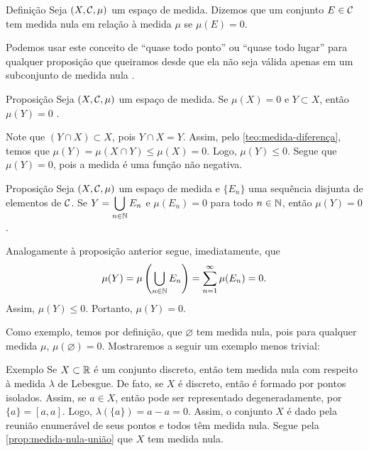 \begin{env}{Definição}
	\label{def:conjunto-medida-nula}
	Seja $(X, \operatorname{\mathcal{C}}, \mu)$ um espaço de medida.
	Dizemos que um conjunto $E \in \operatorname{\mathcal{C}}$ tem medida nula em relação à medida $\mu$ se $\mu(E) = 0$.
\end{env}

Podemos usar este conceito de \enquote{quase todo ponto} ou \enquote{quase todo lugar} para qualquer proposição que queiramos desde que ela não seja válida apenas em um subconjunto de medida nula \cite{bartle}.
\begin{env}{Proposição}
	\label{prop:medida-nula-subconjunto}
	Seja $(X, \operatorname{\mathcal{C}}, \mu)$ um espaço de medida.
	Se $\mu(X) = 0$ e $Y \subset X$, então $\mu(Y) = 0$ \cite[p.343, adaptação nossa]{elon}.
\end{env}
\begin{prova}
	Note que $(Y \cap X) \subset X$, pois $ Y \cap X = Y$.
	Assim, pelo \ref{teo:medida-diferença}, temos que
	$
	\mu(Y) = \mu(X \cap Y) \leq \mu(X) = 0
	$.
	Logo, $\mu(Y) \leq 0$.
	Segue que $\mu(Y) = 0$, pois a medida é uma função não negativa.
	\vspace{-0.4cm}
\end{prova}

\begin{env}{Proposição}
	\label{prop:medida-nula-união}
	Seja $(X, \operatorname{\mathcal{C}}, \mu)$ um espaço de medida e $\{E_n\}$ uma sequência disjunta de elementos de $\operatorname{\mathcal{C}}$.
	Se $Y = \displaystyle\bigcup_{n \in \operatorname{\mathbb{N}}}E_n$ e $\mu(E_n) = 0$ para todo $n \in \operatorname{\mathbb{N}}$, então $\mu(Y) = 0$ \cite[p.343, adaptação nossa]{elon}.
\end{env}
\begin{prova}
	Analogamente à proposição anterior segue, imediatamente, que
	$$
	\mu(Y)
	=
	\mu\left(\bigcup_{n \in \operatorname{\mathbb{N}}}E_n\right)
	=
	\sum_{n = 1}^\infty \mu(E_n)
	= 0.
	$$
	Assim,
	$\mu(Y)\leq 0$. Portanto, $\mu(Y) = 0$.
\end{prova}

Como exemplo, temos por definição, que $\varnothing$ tem medida nula, pois para qualquer medida $\mu$, $\mu(\varnothing) = 0$.
Mostraremos a seguir um exemplo menos trivial:

\begin{env}{Exemplo}
	Se $X \subset \mathbb{R}$ é um conjunto discreto, então tem medida nula com respeito à medida $\lambda$ de Lebesgue.
	De fato, se $X$ é discreto, então é formado por pontos isolados.
	Assim, se $a \in X$, então pode ser representado degeneradamente, por 
	$\{a\} = [a,a]$.
	Logo, $\lambda(\{a\}) = a - a = 0$.
	Assim, o conjunto $X$ é dado pela reunião enumerável de seus pontos e todos têm medida nula. 
	Segue pela \ref{prop:medida-nula-união} que $X$ tem medida nula.
\end{env}


 

